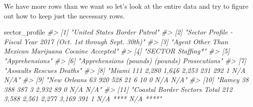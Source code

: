 \documentclass[
  12pt,
]{book}
\newenvironment{Shaded}{\begin{snugshade}}{\end{snugshade}}
\newcommand{\CommentTok}[1]{\textcolor[rgb]{0.56,0.35,0.01}{\textit{#1}}}
\newcommand{\NormalTok}[1]{#1}
\begin{document}
We have more rows than we want so let's look at the entire data and try to figure out how to keep just the necessary rows.

\begin{Shaded}
\begin{Highlighting}[]
\NormalTok{sector\_profile}
\CommentTok{\#>  [1] "United States Border Patrol"                                                                                                                                                                         }
\CommentTok{\#>  [2] "Sector Profile {-} Fiscal Year 2017 (Oct. 1st through Sept. 30th)"                                                                                                                                     }
\CommentTok{\#>  [3] "Agent                              Other Than Mexican           Marijuana          Cocaine         Accepted"                                                                                         }
\CommentTok{\#>  [4] "SECTOR                            Staffing*"                                                                                                                                                         }
\CommentTok{\#>  [5] "Apprehensions"                                                                                                                                                                                       }
\CommentTok{\#>  [6] "Apprehensions                (pounds)          (pounds)    Prosecutions"                                                                                                                             }
\CommentTok{\#>  [7] "Assaults Rescues       Deaths"                                                                                                                                                                       }
\CommentTok{\#>  [8] "Miami                                             111               2,280                    1,646                   2,253             231              292               1           N/A     N/A"   }
\CommentTok{\#>  [9] "New Orleans                                        63                920                      528                      21                6               10               0           N/A     N/A"   }
\CommentTok{\#> [10] "Ramey                                              38                388                      387                       3             2,932              89               0           N/A     N/A"   }
\CommentTok{\#> [11] "Coastal Border Sectors Total                      212               3,588                    2,561                   2,277            3,169             391               1        N/A **** N/A ****"}

\end{Highlighting}
\end{Shaded}
\end{document}
